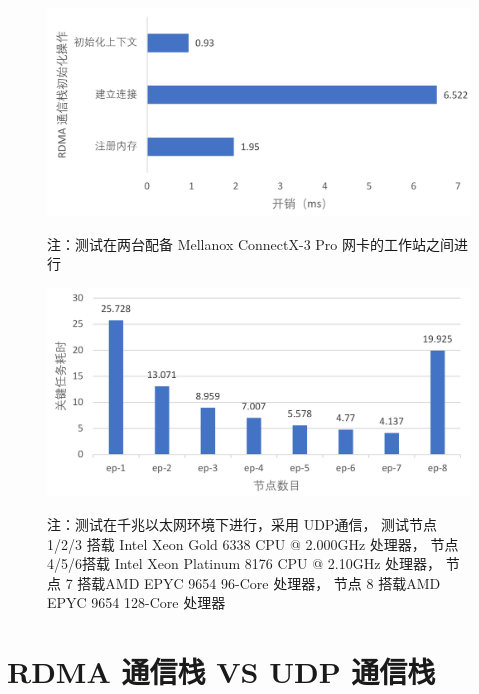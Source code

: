 {    \begin{figure}[!htbp]
        \centering
        \includegraphics[width=0.85\linewidth]{Img/RDMA通信栈初始化开销分析.pdf}
        \label{fig:time-init-rdma-comm}
        {\footnotesize \par 注：测试在两台配备 Mellanox ConnectX-3 Pro 网卡的工作站之间进行}
    \end{figure}

    \begin{figure}[!htbp]
        \centering
        \includegraphics[width=\linewidth]{Img/EP-performance.pdf}
        \label{fig:ep-performance}
        {\footnotesize \par 注：测试在千兆以太网环境下进行，采用 UDP通信，
            测试节点1/2/3 搭载 Intel Xeon Gold 6338 CPU @ 2.000GHz 处理器，
            节点4/5/6搭载 Intel Xeon Platinum 8176 CPU @ 2.10GHz 处理器，
            节点 7 搭载AMD EPYC 9654 96-Core 处理器，
            节点 8 搭载AMD EPYC 9654 128-Core 处理器}
    \end{figure}

    \section{RDMA 通信栈 VS UDP 通信栈}\label{sec:通信栈}

}
